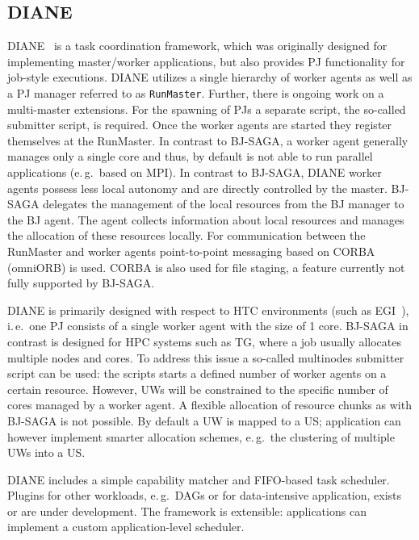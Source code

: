 \documentclass[conference,final]{IEEEtran}
\begin{document}
\subsection{DIANE}

DIANE~\cite{Moscicki:908910} is a task coordination framework, which was
originally designed for implementing master/worker applications, but 
also provides PJ functionality for job-style executions. DIANE utilizes a single
hierarchy of worker agents as well as a PJ manager referred to as
\texttt{RunMaster}. Further, there is ongoing work on a multi-master extensions.
For the spawning of PJs a separate script, the so-called submitter script, is
required. Once the worker agents are started they register themselves at the
RunMaster. In contrast to BJ-SAGA, a worker agent generally manages only a
single core and thus, by default is not able to run parallel applications
(e.\,g.\ based on MPI). In contrast to BJ-SAGA, DIANE worker agents possess less
local autonomy and are directly controlled by the master. BJ-SAGA delegates the
management of the local resources from the BJ manager to the BJ agent. The agent
collects information about local resources and manages the allocation of these
resources locally. For communication between the RunMaster and worker agents
point-to-point messaging based on CORBA (omniORB) is used. CORBA is also used
for file staging, a feature currently not fully supported by BJ-SAGA.

DIANE is primarily designed with respect to HTC environments (such as
EGI~\cite{egi}), i.\,e.\ one PJ consists of a single worker agent with the size
of 1 core. BJ-SAGA in contrast is designed for HPC systems such as TG, where a
job usually allocates multiple nodes and cores. To address this issue a
so-called multinodes submitter script can be used: the scripts starts a defined
number of worker agents on a certain resource. However, UWs will be constrained
to the specific number of cores managed by a worker agent. A flexible allocation
of resource chunks as with BJ-SAGA is not possible. By default a UW is mapped to
a US; application can however implement smarter allocation schemes, e.\,g.\ the
clustering of multiple UWs into a US.

DIANE includes a simple capability matcher and FIFO-based task scheduler.
Plugins for other workloads, e.\,g.\ DAGs or for data-intensive
application, exists or are under development. The framework is extensible:
applications can implement a custom application-level scheduler.
\end{document}
